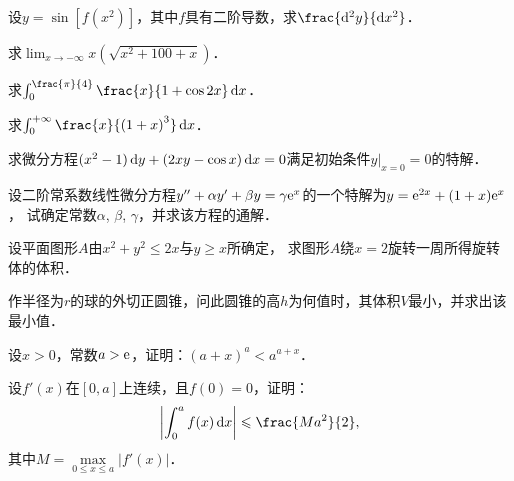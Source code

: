 \documentclass[plain,noanswer,medmath]{../../template/jnuexam}
\begin{document}


\begin{problem}
设$y = \sin[f(x^2)]$，其中$f$具有二阶导数，求$\frac{\d^2y}{\dx^2}$．
\end{problem}


\begin{problem}
求$\lim_{x \to -\infty} x(\sqrt{x^2 + 100 + x})$．
\end{problem}


\begin{problem}
求$\int_0^{\frac{\pi}{4}} \frac{x}{1 + \cos 2x} \dx$．
\end{problem}


\begin{problem}
求$\int_0^{+\infty} \frac{x}{\left(1 + x \right)^3} \dx$．
\end{problem}


\begin{problem}
求微分方程$(x^2 - 1)\mathop{}\!\mathrm{d} y + (2xy - \cos x)\mathop{}\!\mathrm{d} x = 0$满足初始条件$y|_{x = 0} = 0$的特解．
\end{problem}



\begin{problem}
设二阶常系数线性微分方程$y'' + \alpha y' + \beta y = \gamma \mathrm{e}^x$的一个特解为$y =\mathrm{e}^{2x} + (1 + x)\mathrm{e}^x$，
试确定常数$\alpha$, $\beta$, $\gamma$，并求该方程的通解．
\end{problem}



\begin{problem}
设平面图形$A$由$x^2 + y^2 \le 2x$与$y \ge x$所确定，
求图形$A$绕$x = 2$旋转一周所得旋转体的体积．
\end{problem}



\begin{problem}
作半径为$r$的球的外切正圆锥，问此圆锥的高$h$为何值时，其体积$V$最小，并求出该最小值．
\end{problem}



\begin{problem}
设$x > 0$，常数$a > \mathrm{e}$，证明：$(a + x)^a < a^{a + x}$．
\end{problem}



\begin{problem}
设$f'(x)$在$[0,a]$上连续，且$f(0) = 0$，证明：
$$\left| \int_0^a f(x)\dx \right| \le \frac{Ma^2}{2},$$
其中$M = \max\limits_{0 \le x \le a} \left| f'(x) \right|$．
\end{problem}
\end{document}
